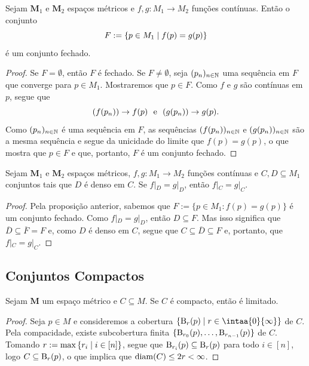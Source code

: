 \begin{prop}
	Sejam $\bm M_1$ e $\bm M_2$ espaços métricos e $f,g\colon M_1 \to M_2$ funções contínuas. Então o conjunto 
	\begin{equation*}
	F := \left\{p \in M_1 \;\middle\vert\; f(p)=g(p) \right\}
	\end{equation*}
é um conjunto fechado.
\end{prop}
\begin{proof}
	Se $F=\emptyset$, então $F$ é fechado. Se $F \neq \emptyset$, seja $(p_n)_{n \in \mathbb{N}}$ uma sequência em $F$ que converge para $p \in M_1$. Mostraremos que $p \in F$. Como $f$ e $g$ são contínuas em $p$, segue que
	\begin{equation*}
	(f(p_n)) \rightarrow f(p) \text{\ \ e\ \ } (g(p_n)) \rightarrow g(p).
	\end{equation*}
	Como $(p_n)_{n \in \mathbb{N}}$ é uma sequência em $F$, as sequências $(f(p_n))_{n \in \mathbb{N}}$ e $(g(p_n))_{n \in \mathbb{N}}$ são a mesma sequência e segue da unicidade do limite que $f(p)=g(p)$, o que mostra que $p \in F$ e que, portanto, $F$ é um conjunto fechado.
\end{proof}

\begin{prop}
	Sejam $\bm M_1$ e $\bm M_2$ espaços métricos, $f,g: M_1 \to M_2$ funções contínuas e $C,D \subseteq M_1$ conjuntos tais que $D$ é denso em $C$. Se $f|_D = g|_D$, então $f|_C = g|_C$.
\end{prop}
\begin{proof}
	Pela proposição anterior, sabemos que $F := \{p \in M_1 : f(p)=g(p)\}$ é um conjunto fechado. Como $f|_D = g|_D$, então $D \subseteq F$. Mas isso significa que $\overline D \subseteq \overline F = F$ e, como $D$ é denso em $C$, segue que $C \subseteq \overline D \subseteq F$ e, portanto, que $f|_C = g|_C$. 
\end{proof}

\subsection{Conjuntos Compactos}

\begin{prop}
Sejam $\bm M$ um espaço métrico e $C \subseteq M$. Se $C$ é compacto, então é limitado.
\end{prop}
\begin{proof}
Seja $p \in M$ e consideremos a cobertura $\set{\bola_r(p)}{r \in \intaa{0}{\infty}}$ de $C$. Pela compacidade, existe subcobertura finita $\{\mathrm{B}_{r_0}(p),\ldots,\mathrm{B}_{r_{n-1}}(p)\}$ de $C$. Tomando $r := \max\left\{r_i \;\middle\vert\; i \in [n] \right\}$, segue que $\mathrm{B}_{r_i}(p) \subseteq \mathrm{B}_{r}(p)$ para todo $i \in [n]$, logo $C \subseteq \mathrm{B}_r(p)$, o que implica que $\operatorname{diam}(C) \leq 2r < \infty$. 
\end{proof}

